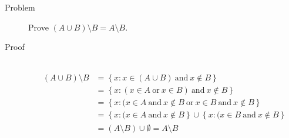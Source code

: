 \begin{description}
\item[Problem]
Prove $(A \cup B) \setminus B = A \setminus B$.

\item[Proof]~\\
\begin{equation*}
\begin{aligned}
(A \cup B) \setminus B
                 &= \left\{ x : x \in (A \cup B)\ \text{and}\ x \not \in B
                    \right\} \\
                 &= \left\{ x : (x \in A\ \text{or}\ x \in B)\ \text{and}\ x
                    \not \in B\right\} \\
                 &= \left\{ x : (x \in A\ \text{and}\ x \not \in B\ 
                    \text{or}\ x \in B\ \text{and}\ x \not \in B\right\} \\
                 &= \left\{ x : (x \in A\ \text{and}\ x \not \in B\right\}
                    \cup
                    \left\{ x : (x \in B\ \text{and}\ x \not \in B\right\} \\
                 &= (A \setminus B) \cup \emptyset = A \setminus B
\end{aligned}
\end{equation*}

\end{description}
